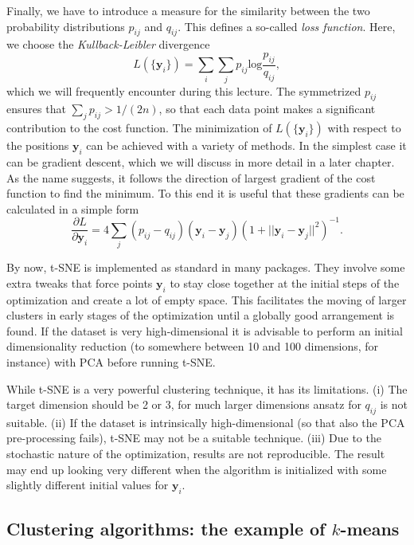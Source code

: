 Finally, we have to introduce a measure for the similarity between the two probability distributions $p_{ij}$ and $q_{ij}$. This defines a so-called \emph{loss function}. Here, we choose the \emph{Kullback-Leibler} divergence
\begin{equation}
L(\{\bm{y}_i\})=\sum_i\sum_jp_{ij}\mathrm{log}\frac{p_{ij}}{q_{ij}},
\label{eq:KL}
\end{equation}
which we will frequently encounter during this lecture. The symmetrized $p_{ij}$ ensures that $\sum_j p_{ij}>1/(2n)$, so that each data point makes a significant contribution to the cost function. 
The minimization of $L(\{\bm{y}_i\})$ with respect to the positions $\bm{y}_i$ can be achieved with a variety of methods. In the simplest case it can be gradient descent, which we will discuss in more detail in a later chapter. As the name suggests, it follows the direction of largest gradient of the cost function to find the minimum. To this end it is useful that these gradients can be calculated in a simple form
\begin{equation}
\frac{\partial L}{\partial \bm{y}_i}
=4\sum_j (p_{ij}-q_{ij})(\bm{y}_i-\bm{y}_j)(1+||\bm{y}_i-\bm{y}_j||^2)^{-1}.
\end{equation} 

By now, t-SNE is implemented as standard in many packages. They involve some extra tweaks that force points $\bm{y}_i$ to stay close together at the initial steps of the optimization and create a lot of empty space. This facilitates the moving of larger clusters in early stages of the optimization until a globally good arrangement is found. If the dataset is very high-dimensional it is advisable to perform an initial dimensionality reduction (to somewhere between 10 and 100 dimensions, for instance) with PCA before running t-SNE. 

While t-SNE is a very powerful clustering technique, it has its limitations. (i) The target dimension should be 2 or 3, for much larger dimensions ansatz for $q_{ij}$ is not suitable. (ii) If the dataset is intrinsically high-dimensional (so that also the PCA pre-processing fails), t-SNE may not be a suitable technique. (iii) Due to the stochastic nature of the optimization, results are not reproducible. The result may end up looking very different when the algorithm is initialized with some slightly different initial values for $\bm{y}_i$. 


\subsection{Clustering algorithms: the example of $k$-means}

